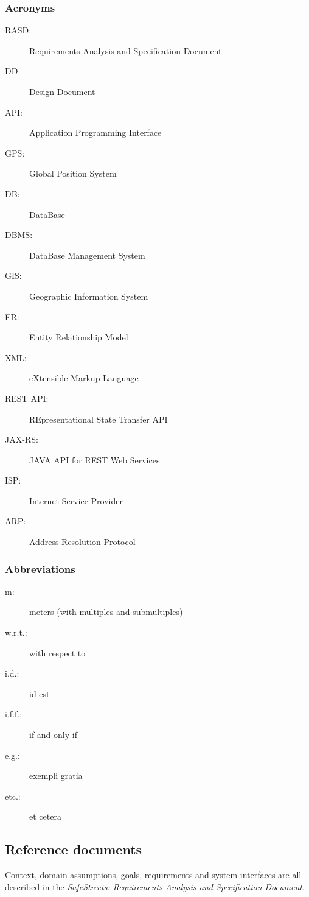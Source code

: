 \subsubsection{Acronyms}
	\begin{description}
		\item [RASD:] Requirements Analysis and Specification Document
		\item [DD:] Design Document
		\item [API:] Application Programming Interface
		\item [GPS:] Global Position System
		\item [DB:] DataBase
		\item [DBMS:] DataBase Management System
		\item [GIS:] Geographic Information System
		\item [ER:] Entity Relationship Model
		\item [XML:] eXtensible Markup Language
		\item [REST API:] REpresentational State Transfer API
		\item [JAX-RS:] JAVA API for REST Web Services
		\item [ISP:] Internet Service Provider
		\item [ARP:] Address Resolution Protocol
	\end{description}
\subsubsection{Abbreviations}
	\begin{description}
		\item [m:] meters (with multiples and submultiples)
		\item [w.r.t.:] with respect to
		\item [i.d.:] id est
		\item [i.f.f.:] if and only if
		\item [e.g.:] exempli gratia
		\item [etc.:] et cetera
	\end{description}

\subsection{Reference documents}
Context, domain assumptions, goals, requirements and system interfaces are all described in the \emph{SafeStreets: Requirements Analysis and Specification Document}. \cite{RASD}\\

